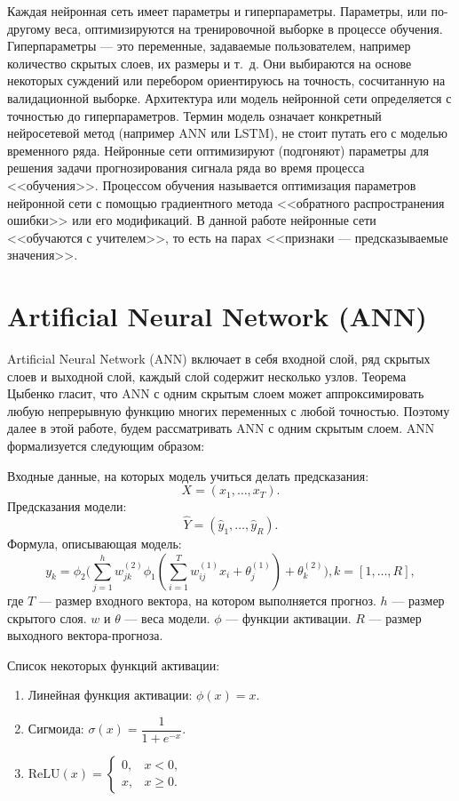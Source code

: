 \documentclass[specialist,
               substylefile = spbu.rtx,
               subf,href,colorlinks=true, 12p]{disser}
\begin{document}
Каждая нейронная сеть имеет параметры и гиперпараметры. Параметры, или по-другому веса, оптимизируются на тренировочной выборке в процессе обучения. Гиперпараметры --- это переменные, задаваемые пользователем, например количество скрытых слоев, их размеры и т.~д. Они выбираются на основе некоторых суждений или перебором ориентируюсь на точность, сосчитанную на валидационной выборке. Архитектура или модель нейронной сети определяется с точностью до гиперпараметров. Термин модель означает конкретный нейросетевой метод (например ANN или LSTM), не стоит путать его с моделью временного ряда. Нейронные сети оптимизируют (подгоняют) параметры для решения задачи прогнозирования сигнала ряда во время процесса <<обучения>>. Процессом обучения называется оптимизация параметров нейронной сети с помощью градиентного метода <<обратного распространения ошибки>> или его модификаций. В данной работе нейронные сети <<обучаются с учителем>>, то есть на парах <<признаки --- предсказываемые значения>>.


\section{Artificial Neural Network (ANN)}

Artificial Neural Network (ANN) включает в себя входной слой, ряд скрытых слоев и выходной слой, каждый слой содержит несколько узлов. Теорема Цыбенко гласит, что ANN с одним скрытым слоем может аппроксимировать любую непрерывную функцию многих переменных с любой точностью. Поэтому далее в этой работе, будем рассматривать ANN с одним скрытым слоем. ANN формализуется следующим образом:

Входные данные, на которых модель учиться делать предсказания:
$$ X = (x_1, \ldots, x_T).$$
Предсказания модели:
$$ \widehat{Y} = (\hat{y}_1, \ldots, \hat{y}_R). $$
Формула, описывающая модель:
$$ y_k = \phi_2\bigg(\sum\limits_{j=1}^{h} w^{(2)}_{jk} \phi_1(\sum\limits_{i=1}^{T} w^{(1)}_{ij} x_{i} + \theta^{(1)}_{j})  + \theta^{(2)}_k \bigg), k = [1, \ldots, R], $$
где $T$ --- размер входного вектора, на котором выполняется прогноз. $h$ --- размер скрытого слоя. $w$ и $\theta$ --- веса модели. $\phi$ --- функции активации. $R$ --- размер выходного вектора-прогноза.

Список некоторых функций активации:
\begin{enumerate}
	\item Линейная функция активации: $\phi(x) = x$.
	\item Сигмоида: $\sigma(x) = \dfrac{1}{1 + e^{-x}}$.
	\item $\mathrm{ReLU}(x) = \begin{cases}
		0, & x < 0, \\
		x, & x \geqslant 0.
	\end{cases}$
\end{enumerate}
\end{document}
